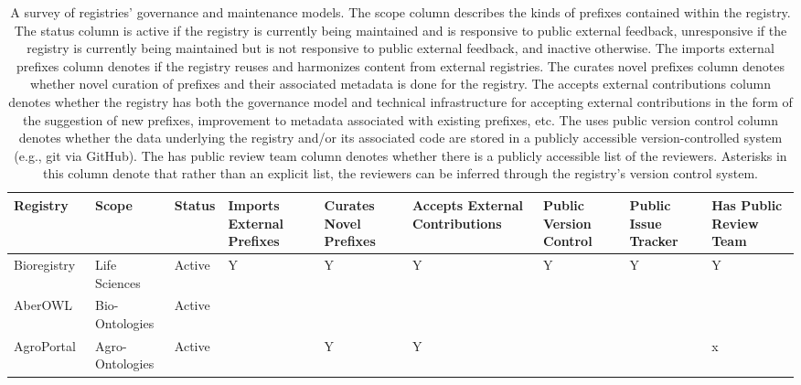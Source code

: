 \begin{table}
\centering
\caption{A survey of registries' governance and maintenance models. The scope column describes the kinds of prefixes contained within the registry. The status column is active if the registry is currently being maintained and is responsive to public external feedback, unresponsive if the registry is currently being maintained but is not responsive to public external feedback, and inactive otherwise. The imports external prefixes column denotes if the registry reuses and harmonizes content from external registries. The curates novel prefixes column denotes whether novel curation of prefixes and their associated metadata is done for the registry. The accepts external contributions column denotes whether the registry has both the governance model and technical infrastructure for accepting external contributions in the form of the suggestion of new prefixes, improvement to metadata associated with existing prefixes, etc. The uses public version control column denotes whether the data underlying the registry and/or its associated code are stored in a publicly accessible version-controlled system (e.g., git via GitHub). The has public review team column denotes whether there is a publicly accessible list of the reviewers. Asterisks in this column denote that rather than an explicit list, the reviewers can be inferred through the registry's version control system.}
\label{tab:registry-comparison-governance}
\begin{tabular}{lllllllll}
\toprule
                               Registry &           Scope &       Status & Imports External Prefixes & Curates Novel Prefixes & Accepts External Contributions & Public Version Control & Public Issue Tracker & Has Public Review Team \\
\midrule
            Bioregistry~\cite{Hoyt2022} &   Life Sciences &       Active &                         Y &                      Y &                              Y &                      Y &                    Y &                      Y \\
           AberOWL~\cite{Hoehndorf2015} &  Bio-Ontologies &       Active &                           &                        &                                &                        &                      &                        \\
          AgroPortal~\cite{Jonquet2018} & Agro-Ontologies &       Active &                           &                      Y &                              Y &                        &                      &                      x \\

\end{tabular}
\end{table}
